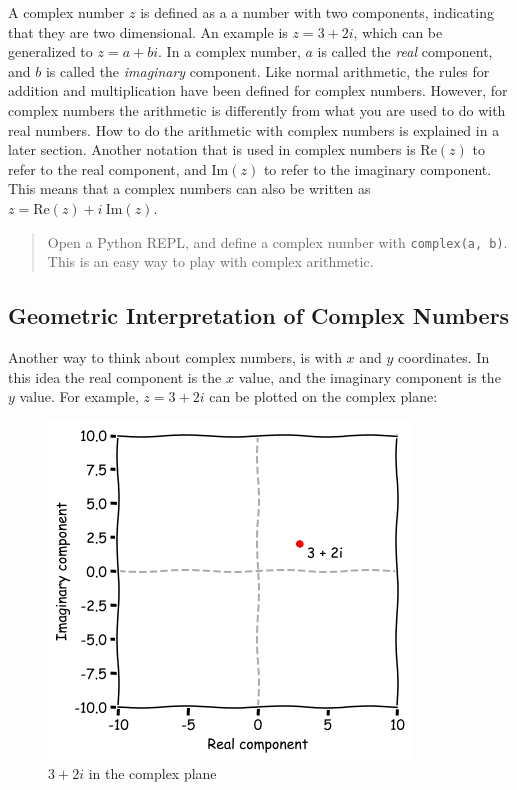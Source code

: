 \documentclass[11pt]{article}
\makeatletter
\def\maxwidth{\ifdim\Gin@nat@width>\linewidth\linewidth
    \else\Gin@nat@width\fi}
\let\Oldincludegraphics\includegraphics
\renewcommand{\includegraphics}[1]{\Oldincludegraphics[width=.8\maxwidth]{#1}}
\makeatother
\begin{document}
    A complex number \(z\) is defined as a a number with two components,
indicating that they are two dimensional. An example is \(z=3+2i\),
which can be generalized to \(z=a + bi\). In a complex number, \(a\) is
called the \emph{real} component, and \(b\) is called the
\emph{imaginary} component. Like normal arithmetic, the rules for
addition and multiplication have been defined for complex numbers.
However, for complex numbers the arithmetic is differently from what you
are used to do with real numbers. How to do the arithmetic with complex
numbers is explained in a later section. Another notation that is used
in complex numbers is \(\textrm{Re}(z)\) to refer to the real component,
and \(\textrm{Im}(z)\) to refer to the imaginary component. This means
that a complex numbers can also be written as
\(z=\textrm{Re}(z) + i\ \textrm{Im}(z)\).

    \begin{quote}
Open a Python REPL, and define a complex number with
\texttt{complex(a,\ b)}. This is an easy way to play with complex
arithmetic.
\end{quote}

    \hypertarget{geometric-interpretation-of-complex-numbers}{%
\subsection{Geometric Interpretation of Complex
Numbers}\label{geometric-interpretation-of-complex-numbers}}

Another way to think about complex numbers, is with \(x\) and \(y\)
coordinates. In this idea the real component is the \(x\) value, and the
imaginary component is the \(y\) value. For example, \(z=3+2i\) can be
plotted on the complex plane:

    \begin{figure}[h]
\centering
\includegraphics{img/complex-plane1.png}
\caption{\(3+2i\) in the complex plane}
\end{figure}
\end{document}
